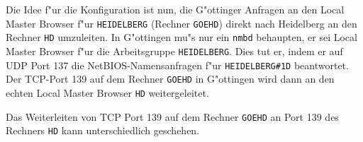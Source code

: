 \documentclass{scrartcl}\usepackage{pslatex}\typearea{12}
\newcommand{\prog}{\texttt}
\newcommand{\nbname}{\texttt}
\begin{document}
Die Idee f"ur die Konfiguration ist nun, die G"ottinger Anfragen an
den Local Master Browser f"ur \nbname{HEIDELBERG} (Rechner
\nbname{GOEHD}) direkt nach Heidelberg an den Rechner \nbname{HD}
umzuleiten. In G"ottingen mu"s nur ein \prog{nmbd} behaupten, er sei
Local Master Browser f"ur die Arbeitsgruppe \nbname{HEIDELBERG}. Dies
tut er, indem er auf UDP Port 137 die NetBIOS-Namensanfragen f"ur
\nbname{HEIDELBERG\#1D} beantwortet. Der TCP-Port 139 auf dem Rechner
\nbname{GOEHD} in G"ottingen wird dann an den echten Local Master
Browser \nbname{HD} weitergeleitet.

Das Weiterleiten von TCP Port 139 auf dem Rechner \nbname{GOEHD} an
Port 139 des Rechners \nbname{HD} kann unterschiedlich geschehen. 

\setlength{\unitlength}{4144sp}%
%
\begingroup\makeatletter\ifx\SetFigFont\undefined%
\gdef\SetFigFont#1#2#3#4#5{%
  \reset@font\fontsize{#1}{#2pt}%
  \fontfamily{#3}\fontseries{#4}\fontshape{#5}%
  \selectfont}%
\fi\endgroup%
\end{document}
